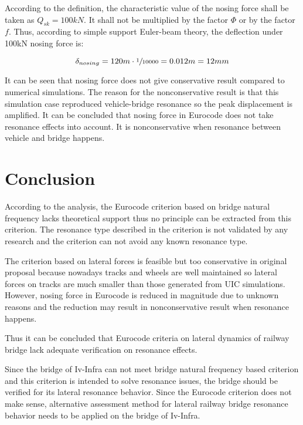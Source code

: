 According to the definition, the characteristic value of the nosing force shall be taken as $Q_{sk} = 100kN$. It shall not be multiplied by the factor $\Phi$ or by the factor $f$. Thus, according to simple support Euler-beam theory, the deflection under 100kN nosing force is:

$$\delta_{nosing} = 120m \cdot \sfrac{1}{10000} = 0.012m = 12mm$$

It can be seen that nosing force does not give conservative result compared to numerical simulations. The reason for the nonconservative result is that this simulation case reproduced vehicle-bridge resonance so the peak displacement is amplified. It can be concluded that nosing force in Eurocode does not take resonance effects into account. It is nonconservative when resonance between vehicle and bridge happens.

\section{Conclusion}
According to the analysis, the Eurocode criterion based on bridge natural frequency lacks theoretical support thus no principle can be extracted from this criterion. The resonance type described in the criterion is not validated by any research and the criterion can not avoid any known resonance type. 

The criterion based on lateral forces is feasible but too conservative in original proposal because nowadays tracks and wheels are well maintained so lateral forces on tracks are much smaller than those generated from UIC simulations. However, nosing force in Eurocode is reduced in magnitude due to unknown reasons and the reduction may result in nonconservative result when resonance happens.

Thus it can be concluded that Eurocode criteria on lateral dynamics of railway bridge lack adequate verification on resonance effects. 

Since the bridge of Iv-Infra can not meet bridge natural frequency based criterion and this criterion is intended to solve resonance issues, the bridge should be verified for its lateral resonance behavior. Since the Eurocode criterion does not make sense, alternative assessment method for lateral railway bridge resonance behavior needs to be applied on the bridge of Iv-Infra.

